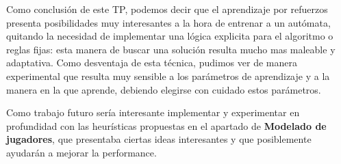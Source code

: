 Como conclusión de este TP, podemos decir que el aprendizaje por refuerzos presenta posibilidades muy interesantes a la hora de entrenar a un autómata, quitando la necesidad de implementar una lógica explicita para el algoritmo o reglas fijas: esta manera de buscar una solución resulta mucho mas maleable y adaptativa. Como desventaja de esta técnica, pudimos ver de manera experimental que resulta muy sensible a los parámetros de aprendizaje y a la manera en la que aprende, debiendo elegirse con cuidado estos parámetros.

Como trabajo futuro sería interesante implementar y experimentar en profundidad con las heurísticas propuestas en el apartado de \textbf{Modelado de jugadores}, que presentaba ciertas ideas interesantes y que posiblemente ayudarán a mejorar la performance.